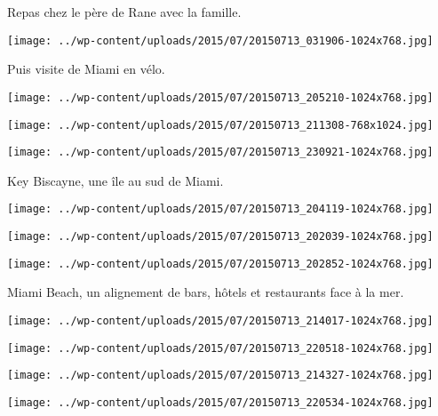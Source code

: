 Repas chez le père de Rane avec la famille. \\
\begin{center} \texttt{[image: ../wp-content/uploads/2015/07/20150713\_031906-1024x768.jpg]} \end{center}

Puis visite de Miami en vélo. 
\begin{center} \texttt{[image: ../wp-content/uploads/2015/07/20150713\_205210-1024x768.jpg]} \end{center}
\begin{center} \texttt{[image: ../wp-content/uploads/2015/07/20150713\_211308-768x1024.jpg]} \end{center}
\begin{center} \texttt{[image: ../wp-content/uploads/2015/07/20150713\_230921-1024x768.jpg]} \end{center}
\vspace{-\topsep}
\vspace{-2.5mm}
\pagebreak

Key Biscayne, une île au sud de Miami.
\begin{center} \texttt{[image: ../wp-content/uploads/2015/07/20150713\_204119-1024x768.jpg]} \end{center}
\begin{center} \texttt{[image: ../wp-content/uploads/2015/07/20150713\_202039-1024x768.jpg]} \end{center}
\begin{center} \texttt{[image: ../wp-content/uploads/2015/07/20150713\_202852-1024x768.jpg]} \end{center}

Miami Beach, un alignement de bars, hôtels et restaurants face à la mer. 
\begin{center} \texttt{[image: ../wp-content/uploads/2015/07/20150713\_214017-1024x768.jpg]} \end{center}
\begin{center} \texttt{[image: ../wp-content/uploads/2015/07/20150713\_220518-1024x768.jpg]} \end{center}
\begin{center} \texttt{[image: ../wp-content/uploads/2015/07/20150713\_214327-1024x768.jpg]} \end{center}
\begin{center} \texttt{[image: ../wp-content/uploads/2015/07/20150713\_220534-1024x768.jpg]} \end{center}